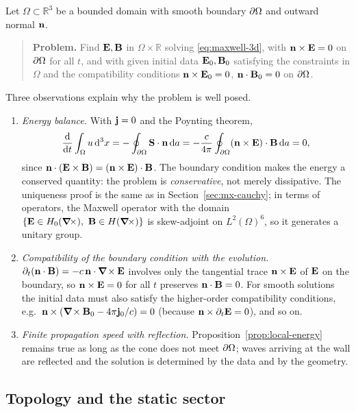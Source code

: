 Let $\Omega\subset\mathbb R^3$ be a bounded domain with smooth boundary
$\partial\Omega$ and outward normal $\mathbf{n}$.

\begin{quote}
\textbf{Problem.}  Find $\mathbf{E},\mathbf{B}$ in $\Omega\times\mathbb R$ solving
\eqref{eq:maxwell-3d}, with $\mathbf{n}\times\mathbf{E}=0$ on $\partial\Omega$ for all $t$,
and with given initial data $\mathbf{E}_0,\mathbf{B}_0$ satisfying the constraints in $\Omega$
and the compatibility conditions $\mathbf{n}\times\mathbf{E}_0=0$, $\mathbf{n}\cdot\mathbf{B}_0=0$ on $\partial\Omega$.
\end{quote}
Three observations explain why the problem is well posed.
\begin{enumerate}
\item \emph{Energy balance.}  With $\mathbf{j}=0$ and the Poynting theorem,
  \begin{equation}
  \frac{\mathrm{d}}{\mathrm{d} t}\int_\Omega u\,\mathrm{d}^3x=-\oint_{\partial\Omega}\mathbf{S}\cdot\mathbf{n}\,\mathrm{d} a
  =-\frac c{4\pi}\oint_{\partial\Omega}(\mathbf{n}\times\mathbf{E})\cdot\mathbf{B}\,\mathrm{d} a=0 ,
  \end{equation}
  since $\mathbf{n}\cdot(\mathbf{E}\times\mathbf{B})=(\mathbf{n}\times\mathbf{E})\cdot\mathbf{B}$.  The boundary condition
  makes the energy a conserved quantity: the problem is
  \emph{conservative}, not merely dissipative.  The uniqueness proof is the
  same as in Section~\ref{sec:mx-cauchy}; in terms of
  operators, the Maxwell operator with the domain
  $\{\mathbf{E}\in H_0(\boldsymbol{\nabla}\!\times),\ \mathbf{B}\in H(\boldsymbol{\nabla}\!\times)\}$ is skew-adjoint on
  $L^2(\Omega)^6$, so it generates a unitary group.
\item \emph{Compatibility of the boundary condition with the evolution.}
  $\partial_t(\mathbf{n}\cdot\mathbf{B})=-c\,\mathbf{n}\cdot\boldsymbol{\nabla}\!\times\mathbf{E}$ involves only the
  tangential trace $\mathbf{n}\times\mathbf{E}$ of $\mathbf{E}$ on the boundary, so
  $\mathbf{n}\times\mathbf{E}=0$ for all $t$ preserves $\mathbf{n}\cdot\mathbf{B}=0$.  For smooth
  solutions the initial data must also satisfy the higher-order
  compatibility conditions, e.g.\ $\mathbf{n}\times(\boldsymbol{\nabla}\!\times\mathbf{B}_0-4\pi\mathbf{j}_0/c)=0$
  (because $\mathbf{n}\times\partial_t\mathbf{E}=0$), and so on.
\item \emph{Finite propagation speed with reflection.}
  Proposition~\ref{prop:local-energy} remains true as long as the cone
  does not meet $\partial\Omega$; waves arriving at the wall are reflected and
  the solution is determined by the data and by the geometry.
\end{enumerate}

\subsection{Topology and the static sector}

